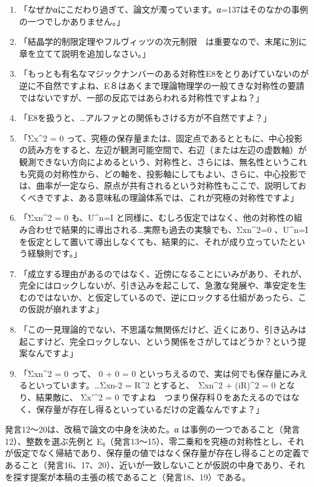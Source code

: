 \documentclass[
  a4paper,
]{ltjsarticle}
\providecommand{\tightlist}{%
  \setlength{\itemsep}{0pt}\setlength{\parskip}{0pt}}
\begin{document}
\begin{enumerate}
\def\labelenumi{\arabic{enumi}.}
\setcounter{enumi}{11}
\tightlist
\item
  「なぜかαにこだわり過ぎて、論文が濁っています。α=137はそのなかの事例の一つでしかありません。」
\item
  「結晶学的制限定理やフルヴィッツの次元制限　は重要なので、末尾に別に章を立てて説明を追加しなさい。」
\item
  「もっとも有名なマジックナンバーのある対称性E8をとりあげていないのが逆に不自然ですよね、E８はあくまで理論物理学の一般てきな対称性の要請ではないですが、一部の反応ではあらわれる対称性ですよね？」
\item
  「E8を扱うと、\ldots アルファとの関係もさける方が不自然ですよ？」
\item
  「Σx\^{}2 = 0
  って、究極の保存量または、固定点であるとともに、中心投影の読み方をすると、左辺が観測可能空間で、右辺（または左辺の虚数軸）が観測できない方向によめるという、対称性と、さらには、無名性というこれも究竟の対称性から、どの軸を、投影軸にしてもよい、さらに、中心投影では、曲率が一定なら、原点が共有されるという対称性もここで、説明しておくべきですよ、ある意味私の理論体系では、これが究極の対称性ですよ」
\item
  「Σxn\^{}2 = 0 も、U\^{}n=I
  と同様に、むしろ仮定ではなく、他の対称性の組み合わせで結果的に導出される\ldots 実際も過去の実験でも、Σxn\^{}2=0
  、U\^{}n=I
  を仮定として置いて導出しなくても、結果的に、それが成り立っていたという経験則です。」
\item
  「成立する理由があるのではなく、近傍になることにいみがあり、それが、完全にはロックしないが、引き込みを起こして、急激な発展や、準安定を生むのではないか、と仮定しているので、逆にロックする仕組があったら、この仮説が崩れますよ」
\item
  「この一見理論的でない、不思議な無関係だけど、近くにあり、引き込みは起こすけど、完全ロックしない、という関係をさがしてはどうか？という提案なんですよ」
\item
  「Σxn\^{}2 = 0 って、 0 + 0 = 0
  といっちえるので、実は何でも保存量にみえるといっています。\ldots Σxn-2
  = R\^{}2 とすると、　Σxn\^{}2 + (iR)\^{}2 = 0 となり、結果敵に、
  Σx'\^{}2 = 0
  ですよね　つまり保存料０をあたえるのではなく、保存量が存在し得るといっているだけの定義なんですよ？」
\end{enumerate}

発言12〜20は、改稿で論文の中身を決めた。α
は事例の一つであること（発言12）、整数を選ぶ先例と
E₈（発言13〜15）、零二乗和を究極の対称性とし、それが仮定でなく帰結であり、保存量の値ではなく保存量が存在し得ることの定義であること（発言16、17、20）、近いが一致しないことが仮説の中身であり、それを探す提案が本稿の主張の核であること（発言18、19）である。
\end{document}
